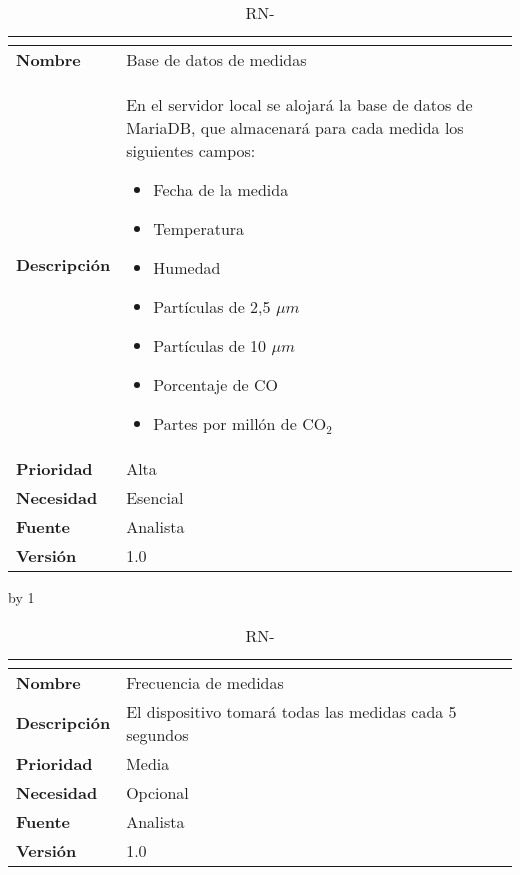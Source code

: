 \begin{table}[H]
	\caption{RN-\number\rn}
	\begin{tabular}{|l|p{}|}
		\hline
		\multicolumn{2}{|c|}{\cellcolor[HTML]{BFBFBF}{\color[HTML]{000000} \textbf{RN-\number\rn}}} \\ \hline
		\textbf{Nombre}      & Base de datos de medidas                                                                                            \\ \hline
		\textbf{Descripción} & En el servidor local se alojará la base de datos de MariaDB, que almacenará para cada medida los siguientes campos:
		\begin{itemize}
			\item Fecha de la medida
			\item Temperatura
			\item Humedad
			\item Partículas de 2,5 $\mu m$
			\item Partículas de 10 $\mu m$
			\item Porcentaje de CO
			\item Partes por millón de CO$_2$
		\end{itemize}  \\ \hline
		\textbf{Prioridad}   & Alta                                                                                                                \\ \hline
		\textbf{Necesidad}   & Esencial                                                                                                            \\ \hline
		\textbf{Fuente}      & Analista                                                                                                            \\ \hline
		\textbf{Versión}     & 1.0                                                                                                                 \\ \hline
	\end{tabular}
\end{table}
\advance\rn by 1
\begin{table}[H]
	\caption{RN-\number\rn}
	\begin{tabular}{|l|p{}|}
		\hline
		\multicolumn{2}{|c|}{\cellcolor[HTML]{BFBFBF}{\color[HTML]{000000} \textbf{RN-\number\rn}}} \\ \hline
		\textbf{Nombre}      & Frecuencia de medidas                                   \\ \hline
		\textbf{Descripción} & El dispositivo tomará todas las medidas cada 5 segundos \\ \hline
		\textbf{Prioridad}   & Media                                                   \\ \hline
		\textbf{Necesidad}   & Opcional                                                \\ \hline
		\textbf{Fuente}      & Analista                                                \\ \hline
		\textbf{Versión}     & 1.0                                                     \\ \hline
	\end{tabular}
\end{table}
